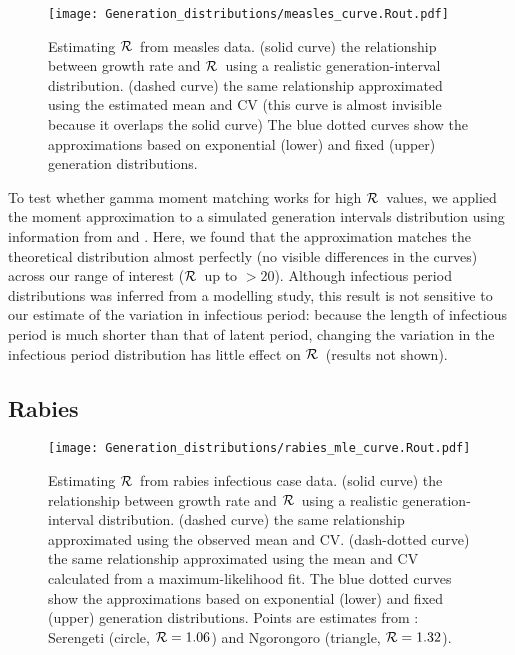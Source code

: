 \documentclass[12pt]{article}
\newcommand{\RR}{\ensuremath{{\cal R}}}
\begin{document}
\begin{figure}[htbp] \centering
	\texttt{[image: Generation\_distributions/measles\_curve.Rout.pdf]}
	\caption{Estimating \RR~from measles data.
		(solid curve) the relationship between growth rate and \RR~using a realistic generation-interval distribution.
		(dashed curve) the same relationship approximated using the estimated mean and CV (this curve is almost invisible because it overlaps the solid curve)
		The blue dotted curves show the approximations based on exponential (lower) and fixed (upper) generation distributions.
	}
	\label{fig:measlesCurve}
\end{figure}

To test whether gamma moment matching works for high \RR\ values, we applied the moment approximation to a simulated generation intervals distribution using information from \cite{LessReic09} and \cite{Lloy01}. 
Here, we found that the approximation matches the theoretical distribution almost perfectly (no visible differences in the curves) across our range of interest (\RR\ up to $>20$).
Although infectious period distributions was inferred from a modelling study, this result is not sensitive to our estimate of the variation in infectious period: because the length of infectious period is much shorter than that of latent period, changing the variation in the infectious period distribution has little effect on \RR\ (results not shown). 

\subsection{Rabies}

\begin{figure}[htbp] \centering
	\texttt{[image: Generation\_distributions/rabies\_mle\_curve.Rout.pdf]}
	\caption{Estimating \RR~from rabies infectious case data.
		(solid curve) the relationship between growth rate and \RR~using a realistic generation-interval distribution.
		(dashed curve) the same relationship approximated using the observed mean and CV.
		(dash-dotted curve) the same relationship approximated using the mean and CV calculated from a maximum-likelihood fit.
		The blue dotted curves show the approximations based on exponential (lower) and fixed (upper) generation distributions.
		Points are estimates from \cite{HampDush09}:
		Serengeti (circle, $\RR=1.06$) and Ngorongoro (triangle, $\RR=1.32$).
	}
	\label{fig:rabiesCurve}
\end{figure}
\end{document}
